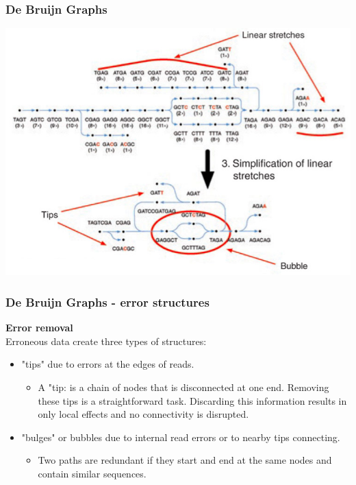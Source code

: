 \documentclass[pdf]{beamer}
\begin{document}
\begin{frame}
\frametitle{De Bruijn Graphs}
\begin{center}
\includegraphics[scale=0.4]{Figures/simplification.png}
\end{center}
\end{frame}

\begin{frame}[allowframebreaks]
\frametitle{De Bruijn Graphs - error structures}
\textbf{Error removal}\\
Erroneous data create three types of structures:
\begin{itemize}
\item "tips" due to errors at the edges of reads.
\begin{itemize}
\item A "tip: is a chain of nodes that is disconnected at one end. Removing these tips is a straightforward task. Discarding this information results in only local effects and no connectivity is disrupted.
\end{itemize}
\item "bulges" or bubbles due to internal read errors or to nearby tips connecting.
\begin{itemize}
\item Two paths are redundant if they start and end at the same nodes and contain similar sequences.
\end{itemize}
\end{itemize}
\end{frame}
\end{document}
